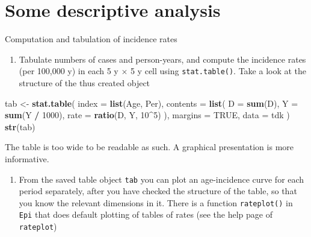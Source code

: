 \documentclass[
]{book}
\newenvironment{Shaded}{\begin{snugshade}}{\end{snugshade}}
\newcommand{\AttributeTok}[1]{\textcolor[rgb]{0.13,0.29,0.53}{#1}}
\newcommand{\ConstantTok}[1]{\textcolor[rgb]{0.56,0.35,0.01}{#1}}
\newcommand{\DecValTok}[1]{\textcolor[rgb]{0.00,0.00,0.81}{#1}}
\newcommand{\FunctionTok}[1]{\textcolor[rgb]{0.13,0.29,0.53}{\textbf{#1}}}
\newcommand{\NormalTok}[1]{#1}
\newcommand{\OtherTok}[1]{\textcolor[rgb]{0.56,0.35,0.01}{#1}}
\newcommand{\SpecialCharTok}[1]{\textcolor[rgb]{0.81,0.36,0.00}{\textbf{#1}}}
\providecommand{\tightlist}{%
  \setlength{\itemsep}{0pt}\setlength{\parskip}{0pt}}
\begin{document}
\section{Some descriptive analysis}\label{some-descriptive-analysis}

Computation and tabulation of incidence rates

\begin{enumerate}
\def\labelenumi{\arabic{enumi}.}
\tightlist
\item
  Tabulate numbers of cases and person-years, and compute the
  incidence rates (per 100,000 y) in each 5 y \(\times\) 5 y cell using
  \texttt{stat.table()}. Take a look at the structure of the thus created object
\end{enumerate}

\begin{Shaded}
\begin{Highlighting}[]
\NormalTok{tab }\OtherTok{\textless{}{-}} \FunctionTok{stat.table}\NormalTok{(}
  \AttributeTok{index =} \FunctionTok{list}\NormalTok{(Age, Per),}
  \AttributeTok{contents =} \FunctionTok{list}\NormalTok{(}
    \AttributeTok{D =} \FunctionTok{sum}\NormalTok{(D),}
    \AttributeTok{Y =} \FunctionTok{sum}\NormalTok{(Y }\SpecialCharTok{/} \DecValTok{1000}\NormalTok{),}
    \AttributeTok{rate =} \FunctionTok{ratio}\NormalTok{(D, Y, }\DecValTok{10}\SpecialCharTok{\^{}}\DecValTok{5}\NormalTok{)}
\NormalTok{  ),}
  \AttributeTok{margins =} \ConstantTok{TRUE}\NormalTok{,}
  \AttributeTok{data =}\NormalTok{ tdk}
\NormalTok{)}
\FunctionTok{str}\NormalTok{(tab)}
\end{Highlighting}
\end{Shaded}

The table is too wide to be readable as such. A graphical
presentation is more informative.

\begin{enumerate}
\def\labelenumi{\arabic{enumi}.}
\setcounter{enumi}{1}
\tightlist
\item
  From the saved table object \texttt{tab} you can plot an
  age-incidence curve for each period separately, after you have
  checked the structure of the table, so that you know the relevant
  dimensions in it. There is a function \texttt{rateplot()} in \texttt{Epi}
  that does default plotting of tables of rates (see the help page of
  \texttt{rateplot})
\end{enumerate}
\end{document}
